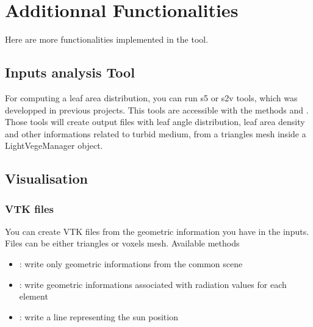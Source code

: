 \documentclass[letterpaper,10pt,english]{sphinxmanual}
\begin{document}
\sphinxstepscope


\section{Additionnal Functionalities}
\label{\detokenize{others:additionnal-functionalities}}\label{\detokenize{others:other}}\label{\detokenize{others::doc}}
\sphinxAtStartPar
Here are more functionalities implemented in the tool.


\subsection{Inputs analysis Tool}
\label{\detokenize{others:inputs-analysis-tool}}
\sphinxAtStartPar
For computing a leaf area distribution, you can run s5 or s2v tools, which was developped in previous projects.
This tools are accessible with the methods  and .
Those tools will create output files with leaf angle distribution, leaf area density and
other informations related to turbid medium, from a triangles mesh inside a LightVegeManager object.


\subsection{Visualisation}
\label{\detokenize{others:visualisation}}

\subsubsection{VTK files}
\label{\detokenize{others:vtk-files}}
\sphinxAtStartPar
You can create VTK files from the geometric information you have in the inputs. Files can be either triangles or voxels mesh. Available methods
\begin{itemize}
\item {} 
\sphinxAtStartPar
{}: write only geometric informations from the common scene

\item {} 
\sphinxAtStartPar
{}: write geometric informations associated with radiation values for each element

\item {} 
\sphinxAtStartPar
{}: write a line representing the sun position

\end{itemize}
\end{document}
